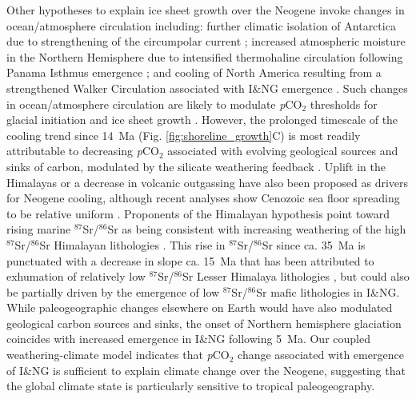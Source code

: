 \documentclass[11pt,letterpaper]{article}
\newcommand{\SrSr}{$^{87}$Sr/$^{86}$Sr\xspace}
\newcommand{\pCOtwo}{\textit{p}CO$_{2}$\xspace}
\begin{document}
Other hypotheses to explain ice sheet growth over the Neogene invoke changes in ocean/atmosphere circulation including: further climatic isolation of Antarctica due to strengthening of the circumpolar current \cite{Shevenell2004a}; increased atmospheric moisture in the Northern Hemisphere due to intensified thermohaline circulation following Panama Isthmus emergence  \cite{Haug1998a}; and cooling of North America resulting from a strengthened Walker Circulation associated with I\&NG emergence \cite{Molnar2015a}. Such changes in ocean/atmosphere circulation are likely to modulate \pCOtwo thresholds for glacial initiation and ice sheet growth \cite{DeConto2008a}. However, the prolonged timescale of the cooling trend since 14~Ma (Fig. \ref{fig:shoreline_growth}C) is most readily attributable to decreasing \pCOtwo associated with evolving geological sources and sinks of carbon, modulated by the silicate weathering feedback \cite{Walker1981a, Raymo1991a, Berner1997a, Kump1997a, Berner2001a}. Uplift in the Himalayas \cite{Raymo1988a} or a decrease in volcanic outgassing \cite{Berner1983a} have also been proposed as drivers for Neogene cooling, although recent analyses show Cenozoic sea floor spreading to be relative uniform \cite{Rowan2016a}. Proponents of the Himalayan hypothesis point toward rising marine \SrSr as being consistent with increasing weathering of the high \SrSr Himalayan lithologies \cite{Raymo1992a}. This rise in \SrSr since ca. 35~Ma is punctuated with a decrease in slope ca. 15~Ma that has been attributed to exhumation of relatively low \SrSr Lesser Himalaya lithologies \cite{Myrow2015a, Colleps2018a}, but could also be partially driven by the emergence of low \SrSr mafic lithologies in I\&NG. While paleogeographic changes elsewhere on Earth would have also modulated geological carbon sources and sinks, the onset of Northern hemisphere glaciation coincides with increased emergence in I\&NG following 5~Ma. Our coupled weathering-climate model indicates that \pCOtwo change associated with emergence of I\&NG is sufficient to explain climate change over the Neogene, suggesting that the global climate state is particularly sensitive to tropical paleogeography.

\end{document}
